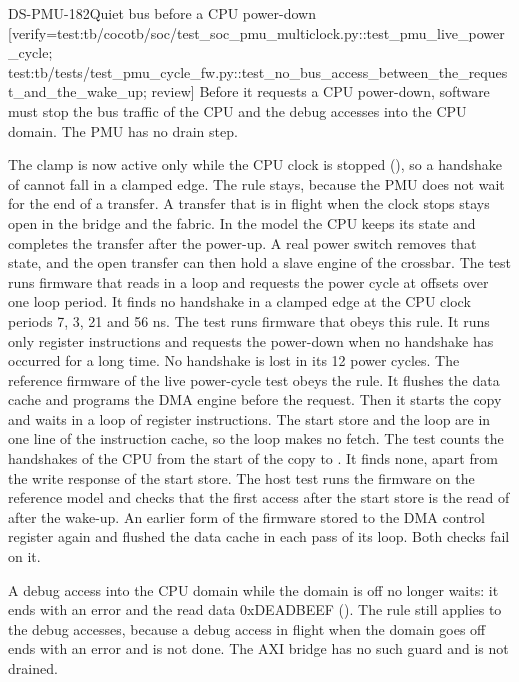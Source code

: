 \begin{requirement}{DS-PMU-182}{Quiet bus before a CPU power-down}
[verify={test:tb/cocotb/soc/test_soc_pmu_multiclock.py::test_pmu_live_power_cycle; test:tb/tests/test_pmu_cycle_fw.py::test_no_bus_access_between_the_request_and_the_wake_up; review}]
Before it requests a CPU power-down, software must stop the bus traffic of the CPU and the debug accesses into the CPU domain. The PMU has no drain step.
\end{requirement}
\begin{information}
The clamp is now active only while the CPU clock is stopped (), so a handshake of  cannot fall in a clamped edge. The rule stays, because the PMU does not wait for the end of a transfer. A transfer that is in flight when the clock stops stays open in the bridge and the fabric. In the model the CPU keeps its state and completes the transfer after the power-up. A real power switch removes that state, and the open transfer can then hold a slave engine of the crossbar. The test  runs firmware that reads  in a loop and requests the power cycle at offsets over one loop period. It finds no handshake in a clamped edge at the CPU clock periods 7, 3, 21 and 56 ns. The test  runs firmware that obeys this rule. It runs only register instructions and requests the power-down when no handshake has occurred for a long time. No handshake is lost in its 12 power cycles. The reference firmware of the live power-cycle test obeys the rule. It flushes the data cache and programs the DMA engine before the request. Then it starts the copy and waits in a loop of register instructions. The start store and the loop are in one line of the instruction cache, so the loop makes no fetch. The test  counts the handshakes of the CPU from the start of the copy to . It finds none, apart from the write response of the start store. The host test  runs the firmware on the reference model and checks that the first access after the start store is the read of  after the wake-up. An earlier form of the firmware stored to the DMA control register again and flushed the data cache in each pass of its loop. Both checks fail on it.

A debug access into the CPU domain while the domain is off no longer waits: it ends with an error and the read data 0xDEADBEEF (). The rule still applies to the debug accesses, because a debug access in flight when the domain goes off ends with an error and is not done. The AXI bridge  has no such guard and is not drained.
\end{information}

